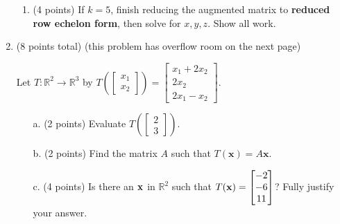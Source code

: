 \documentclass[12pt]{extarticle}
\begin{document}
\begin{enumerate}
\begin{enumerate}
        \item (4 points) If $k=5$, finish reducing the augmented matrix to \textbf{reduced row echelon form},  then solve for $x,y,z$. Show all work.

               \vspace{3in} 



\end{enumerate}

    \newpage
    
    
    

\vspace{2in}


    


\newpage


    

      \item (8 points total) (this problem has overflow room on the next page)
     
     Let $T:\mathbb{R}^2\to\mathbb{R}^3$ by $T\left(\begin{bmatrix} x_1\\ x_2\end{bmatrix}\right)=\begin{bmatrix} x_1+2x_2\\ 2x_2\\ 2x_1-x_2\end{bmatrix}$. %

    
     \begin{itemize} 
     \item[a.] (2 points) Evaluate $T\left(\begin{bmatrix} 2 \\3  \end{bmatrix}\right)$.

     \vspace{1.5in}

     
     \item[b.] (2 points) Find the matrix $A$ such that $T(\mathbf{x})=A\mathbf{x}$.  %

\vspace{1.5in}

     \item[c.] (4 points) Is there an ${\mathbf{x}}$ in $\mathbb{R}^2$ such that $T({\mathbf{x}})=\begin{bmatrix} -2\\ -6\\ 11\end{bmatrix}$? Fully justify your answer. %


\end{itemize}
\end{enumerate}
\end{document}
